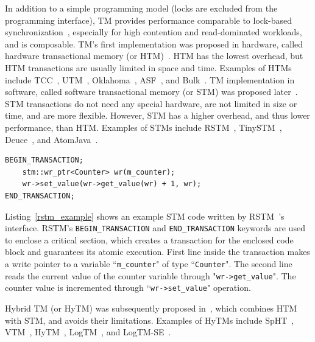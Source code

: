 \documentclass[12pt,english]{report}
\begin{document}
In addition to a simple programming model (locks are excluded from the programming interface), TM provides performance comparable to lock-based synchronization~\cite{Saha:2006:MHP:1122971.1123001}, especially for high contention and read-dominated workloads, and is composable. TM's first implementation was proposed in hardware, called hardware transactional memory (or HTM)~\cite{Herlihy:1993:TMA:165123.165164}. HTM has the lowest overhead, but HTM transactions are usually limited in space and time. Examples of HTMs include TCC~\cite{ham04},
UTM~\cite{UTM1385954}, Oklahoma~\cite{Oklahoma260295}, ASF~\cite{AMDprocHTMchristie2010evaluation}, and Bulk~\cite{BulkCeze:2006:BDS:1135775.1136506}. TM implementation in software, called software transactional memory (or STM) was proposed later~\cite{sha95}. STM transactions do not need any special hardware, are not
limited in size or time, and are more flexible. However, STM has a higher overhead, and thus lower performance, than HTM. Examples of STMs include
RSTM~\cite{RSTM}, TinySTM~\cite{TinySTM}, Deuce~\cite{Deucekorland2010noninvasive},
and AtomJava~\cite{AtomJavahindman2006atomicity}.

\lstset{language=C++}
\begin{lstlisting}[caption={STM example},label=rstm_example]
BEGIN_TRANSACTION;
	stm::wr_ptr<Counter> wr(m_counter);
	wr->set_value(wr->get_value(wr) + 1, wr);
END_TRANSACTION;
\end{lstlisting}

Listing~\ref{rstm_example} shows an example STM code written by  RSTM~\cite{Shriraman:2007:IHA:1250662.1250676}'s interface. RSTM's \texttt{BEGIN\_TRANSACTION} and \texttt{END\_TRANSACTION} keywords are used to enclose a critical section, which creates a transaction for the enclosed code block and guarantees its atomic execution. First line inside the transaction makes a write pointer to a variable ``\lstinline!m_counter!" of type ``\lstinline!Counter!". The second line reads the current value of the counter variable through "\lstinline!wr->get_value!". The counter value is incremented through ``\lstinline!wr->set_value!" operation.

Hybrid TM (or HyTM) was subsequently proposed in~\cite{FirstHyTMlie2004hardware}, 
which combines HTM with STM, and avoids their limitations. Examples of HyTMs include SpHT~\cite{SpHTLev:2008:SHT:1345206.1345236}, VTM~\cite{VTM1431581}, HyTM~\cite{dam06},
LogTM~\cite{logTM1598134}, and LogTM-SE~\cite{logTMSE4147667}.
\end{document}
